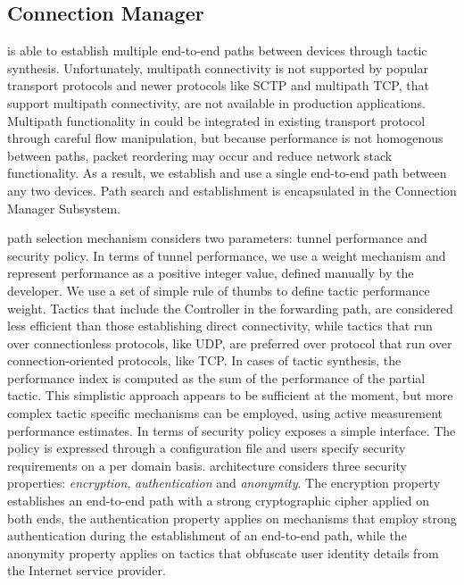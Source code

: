 \subsection{Connection Manager} \label{signpost-engine}

\signpost is able to establish multiple end-to-end paths between devices through
tactic synthesis. Unfortunately, multipath connectivity is not supported by
popular transport protocols and newer protocols like SCTP and multipath TCP,
that support multipath connectivity, are not available in production applications.
Multipath functionality in \signpost could be integrated in existing transport
protocol through careful \of flow manipulation, but because performance is not
homogenous between paths,
packet reordering may occur and reduce network stack functionality.  As a
result,  \signpost we establish and use a single end-to-end path between any
two devices.  Path search
and establishment is encapsulated in the Connection Manager Subsystem. 

\signpost path selection mechanism considers two parameters: tunnel performance
and security policy. In terms of tunnel performance, we use a weight
mechanism and represent performance as a positive integer value, defined manually by the
developer. We use a set of simple rule of thumbs to define tactic performance
weight. Tactics that include the Controller in the forwarding path, are
considered less efficient than those establishing direct connectivity, while
tactics that run over connectionless protocols, like UDP, are preferred over
protocol that run over connection-oriented protocols, like TCP.  In cases of
tactic synthesis, the performance index is computed as the sum of the
performance of the partial tactic. This simplistic approach appears to be
sufficient at the moment, but more complex tactic specific mechanisms can be
employed, using active measurement performance estimates. In terms of security
policy \signpost exposes a simple interface. The policy is
expressed through a configuration file and users specify security requirements
on a per domain basis. \signpost architecture considers three security
properties: \textit{encryption}, \textit{authentication} and \textit{anonymity}.
The encryption property establishes an end-to-end path with a strong
cryptographic cipher applied on both ends, the authentication property applies
on mechanisms that employ strong authentication during the establishment of an
end-to-end path, while the anonymity property applies on tactics that obfuscate
user identity details from the Internet service provider. 

